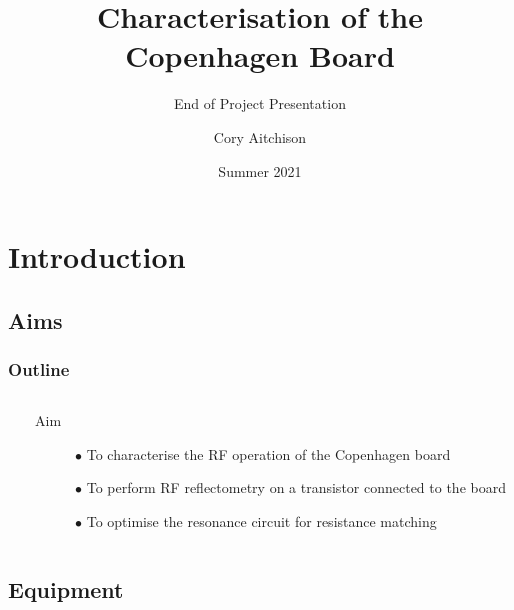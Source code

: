 \documentclass{beamer}
\title{Characterisation of the Copenhagen Board}
\subtitle{End of Project Presentation}
\institute{SQA Summer Research Scholarship}
\author{Cory Aitchison}
\date{Summer 2021}
\begin{document}
\begin{frame}
    \titlepage
\end{frame}

\section{Introduction}

\subsection{Aims}

\begin{frame}
    \frametitle{Outline}
    \begin{columns}
        \begin{column}{0.3\textwidth}
            \tableofcontents
        \end{column}
        \begin{column}{0.6\textwidth}
            \begin{description}
                \item[Aim] $\bullet$ To characterise the RF operation of the Copenhagen board
                \item[] $\bullet$ To perform RF reflectometry on a transistor connected to the board
                \item[] $\bullet$ To optimise the resonance circuit for resistance matching
            \end{description}
        \end{column}
    \end{columns}
\end{frame}

\subsection{Equipment}
\end{document}
